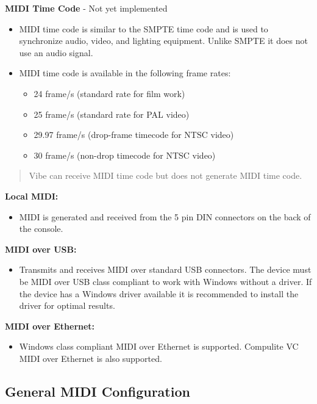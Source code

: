 \documentclass[
]{article}
\providecommand{\tightlist}{%
  \setlength{\itemsep}{0pt}\setlength{\parskip}{0pt}}
\begin{document}
\textbf{MIDI Time Code} - {Not yet implemented}

\begin{itemize}
\item
  MIDI time code is similar to the SMPTE time code and is used to synchronize audio, video, and lighting equipment. Unlike SMPTE it does not use an audio signal.
\item
  MIDI time code is available in the following frame rates:

  \begin{itemize}
  \item
    24 frame/s (standard rate for film work)
  \item
    25 frame/s (standard rate for PAL video)
  \item
    29.97 frame/s (drop-frame timecode for NTSC video)
  \item
    30 frame/s (non-drop timecode for NTSC video)
  \end{itemize}
\end{itemize}

\begin{quote}
Vibe can receive MIDI time code but does not generate MIDI time code.
\end{quote}

\textbf{Local MIDI:}

\begin{itemize}
\tightlist
\item
  MIDI is generated and received from the 5 pin DIN connectors on the back of the console.
\end{itemize}

\textbf{MIDI over USB:}

\begin{itemize}
\tightlist
\item
  Transmits and receives MIDI over standard USB connectors. The device must be MIDI over USB class compliant to work with Windows without a driver. If the device has a Windows driver available it is recommended to install the driver for optimal results.
\end{itemize}

\textbf{MIDI over Ethernet:}

\begin{itemize}
\tightlist
\item
  Windows class compliant MIDI over Ethernet is supported. Compulite VC MIDI over Ethernet is also supported.
\end{itemize}

\hypertarget{general-midi-configuration}{%
\subsection{General MIDI Configuration}\label{general-midi-configuration}}
\end{document}
